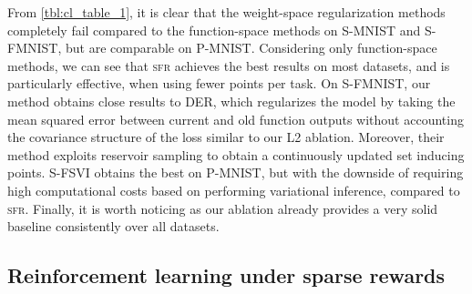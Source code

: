 \documentclass{article}
\newcommand{\our}{\textsc{sfr}\xspace}
\begin{document}
From \cref{tbl:cl_table_1}, it is clear that the weight-space regularization methods completely fail compared to the function-space methods on S-MNIST and S-FMNIST, but are comparable on P-MNIST. %
Considering only function-space methods, we can see that \our achieves the best results on most datasets, and is particularly effective, when using fewer points per task.
On S-FMNIST, our method obtains close results to DER, which regularizes the model by taking the mean squared error between current and old function outputs without accounting the covariance structure of the loss similar to our L2 ablation. Moreover, their method exploits reservoir sampling \citep{vitter1985random} to obtain a continuously updated set inducing points.
S-FSVI obtains the best on P-MNIST, but with the downside of requiring high computational costs based on performing variational inference, compared to \our.  %
Finally, it is worth noticing as our ablation already provides a very solid baseline consistently over all datasets.




\subsection{Reinforcement learning under sparse rewards}
\label{sec:rl-exp}



\end{document}
